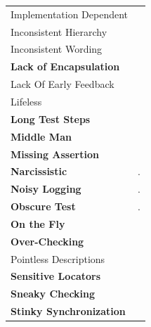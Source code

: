 \begin{table}
\begin{tabularx}{\textwidth}{>{\raggedright}p{1.5in}>{\raggedright}p{4in}}
\scriptsize{Implementation Dependent}  & \scriptsize{\cite{Jain2007, Kapelonis2018, Goldberg2019}} \tabularnewline 

\scriptsize{Inconsistent Hierarchy} & \scriptsize{\cite{Clayton2014, Gawinecki2016, Buwalda2019}} \tabularnewline 

\scriptsize{Inconsistent Wording} & \scriptsize{\cite{Hauptmann2013}} \tabularnewline 

\scriptsize{\textbf{Lack of Encapsulation}} & \scriptsize{\cite{Chen2012, Evangelisti2012, Klarck2014, Buwalda2015, England2016, Renaudin2016, Knight2017a, Goldberg2019, Jones2019, Shay2019}} \tabularnewline 

\scriptsize{Lack Of Early Feedback} & \scriptsize{\cite{Dharmender2017}} \tabularnewline 

\scriptsize{Lifeless} & \scriptsize{\cite{Buwalda2015, Renaudin2016, Buwalda2019}} \tabularnewline 

\scriptsize{\textbf{Long Test Steps}} & \scriptsize{\cite{Chen2012, Hauptmann2013, Buwalda2019}} \tabularnewline

\scriptsize{\textbf{Middle Man}} & \scriptsize{\cite{Chen2012}} \tabularnewline 

\scriptsize{\textbf{Missing Assertion}} & \scriptsize{\cite{Klarck2014}} \tabularnewline 

\scriptsize{\textbf{Narcissistic}} & \scriptsize{\cite{England2016, Knight2017b}.} \tabularnewline

\scriptsize{\textbf{Noisy Logging}} & \scriptsize{\cite{Jain2007}.} \tabularnewline

\scriptsize{\textbf{Obscure Test}} & \scriptsize{\cite{Hauptmann2013, Gawinecki2016, Siminiuc2019}.} \tabularnewline

\scriptsize{\textbf{On the Fly}} & \scriptsize{\cite{Archer2010}} \tabularnewline 

\scriptsize{\textbf{Over-Checking}} & \scriptsize{\cite{Buwalda2015, Renaudin2016}} \tabularnewline

\scriptsize{Pointless Descriptions} & \scriptsize{\cite{England2016}} \tabularnewline 

\scriptsize{\textbf{Sensitive Locators}} & \scriptsize{\cite{Scott2015, Jones2019, Battat2020, Sheth2020}} \tabularnewline

\scriptsize{\textbf{Sneaky Checking}} & \scriptsize{\cite{Kirkbride2014, Buwalda2015, Renaudin2016}} \tabularnewline

\scriptsize{\textbf{Stinky Synchronization}} & \scriptsize{\cite{Gawinecki2016, Renaudin2016, Bushnev2019, Jones2019, Sheth2020}} \tabularnewline 


\end{tabularx}
\end{table}
